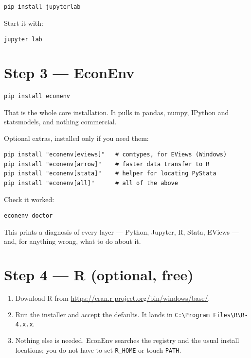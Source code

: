 \documentclass[11pt,a4paper]{report}
\begin{document}
\begin{lstlisting}
pip install jupyterlab
\end{lstlisting}

Start it with:

\begin{lstlisting}
jupyter lab
\end{lstlisting}

\section{Step 3 --- EconEnv}
\label{sec:installecon}

\begin{lstlisting}
pip install econenv
\end{lstlisting}

That is the whole core installation. It pulls in pandas, numpy, IPython and
statsmodels, and nothing commercial.

Optional extras, installed only if you need them:

\begin{lstlisting}
pip install "econenv[eviews]"   # comtypes, for EViews (Windows)
pip install "econenv[arrow]"    # faster data transfer to R
pip install "econenv[stata]"    # helper for locating PyStata
pip install "econenv[all]"      # all of the above
\end{lstlisting}

Check it worked:

\begin{lstlisting}
econenv doctor
\end{lstlisting}

This prints a diagnosis of every layer --- Python, Jupyter, R, Stata, EViews ---
and, for anything wrong, what to do about it.

\section{Step 4 --- R (optional, free)}

\begin{enumerate}
  \item Download R from \url{https://cran.r-project.org/bin/windows/base/}.
  \item Run the installer and accept the defaults. It lands in
        \texttt{C:\textbackslash Program Files\textbackslash R\textbackslash R-4.x.x}.
  \item Nothing else is needed. EconEnv searches the registry and the usual
        install locations; you do not have to set \texttt{R\_HOME} or touch
        \texttt{PATH}.
\end{enumerate}
\end{document}
